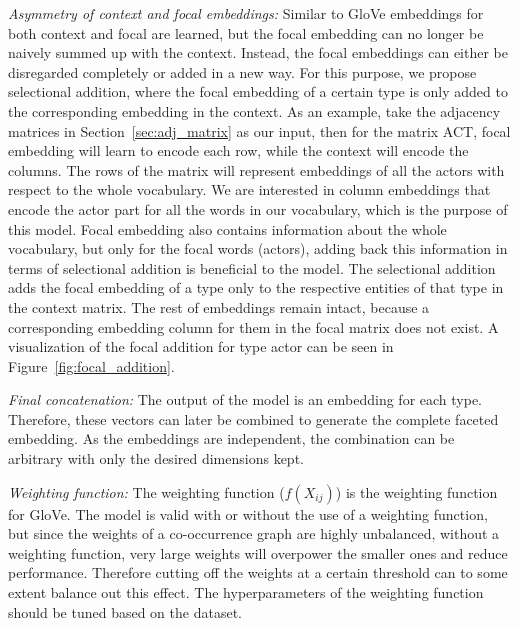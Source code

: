 \begin{compactitem}
\item \emph{Asymmetry of context and focal embeddings:} Similar to GloVe embeddings for both context and focal are learned, but the focal embedding can no longer be naively summed up with the context. Instead, the focal embeddings can either be disregarded completely or added in a new way. For this purpose, we propose selectional addition, where the focal embedding of a certain type is only added to the corresponding embedding in the context. As an example, take the adjacency matrices in Section~\ref{sec:adj_matrix} as our input, then for the matrix ACT,  focal embedding will learn to encode each row, while the context will encode the columns. The rows of the matrix will represent embeddings of all the actors with respect to the whole vocabulary. We are interested in column embeddings that encode the actor part for all the words in our vocabulary, which is the purpose of this model. Focal embedding also contains information about the whole vocabulary, but only for the focal words (actors), adding back this information in terms of selectional addition is beneficial to the model. The selectional addition adds the focal embedding of a type only to the respective entities of that type in the context matrix. The rest of embeddings remain intact, because a corresponding embedding column for them in the focal matrix does not exist. A visualization of the focal addition for type actor can be seen in Figure~\ref{fig:focal_addition}.\\

\item \emph{Final concatenation:} The output of the model is an embedding for each type. Therefore, these vectors can later be combined to generate the complete faceted embedding. As the embeddings are independent, the combination can be arbitrary with only the desired dimensions kept. \\

\item \emph{Weighting function:} The weighting function ($f(X_{ij})$) is the weighting function for GloVe. The model is valid with or without the use of a weighting function, but since the weights of a co-occurrence graph are highly unbalanced, without a weighting function, very large weights will overpower the smaller ones and reduce performance. Therefore cutting off the weights at a certain threshold can to some extent balance out this effect. The hyperparameters of the weighting function should be tuned based on the dataset.\\


\end{compactitem}

